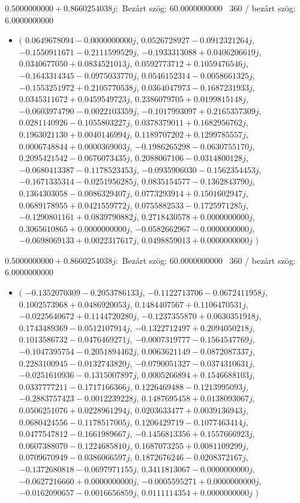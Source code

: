 \documentclass[14pt,a4paper]{article}
\begin{document}
$0.5000000000+0.8660254038j$:\
Bezárt szög: $60.0000000000$ \
360 / bezárt szög: $6.0000000000$\
\begin{itemize}
\item
$\big($
$0.0649678094-0.0000000000j$, $0.0526728927-0.0912321264j$, $-0.1550911671-0.2111599529j$, $-0.1933313088+0.0406206619j$, $0.0340677050+0.0834521013j$, $0.0592773712+0.1059476546j$, $-0.1643314345-0.0975033770j$, $0.0546152314-0.0058661325j$, $-0.1553251972+0.2105770538j$, $0.0364047973-0.1687231933j$, $0.0345311672+0.0459549723j$, $0.2386079705+0.0199815148j$, $-0.0603974790-0.0022103359j$, $-0.1017993097+0.2165357309j$, $0.0281140926-0.1055803227j$, $0.0378379011+0.1682956762j$, $0.1963021130+0.0040146994j$, $0.1189707202+0.1299785557j$, $0.0006748844+0.0000369003j$, $-0.1986265298-0.0630755170j$, $0.2095421542-0.0676073435j$, $0.2088067106-0.0314800128j$, $-0.0680413387-0.1178523453j$, $-0.0935906030-0.1562354453j$, $-0.1671335314-0.0251956285j$, $0.0835154577-0.1362843790j$, $0.1364303058-0.0086329407j$, $0.0773293914+0.1501602947j$, $0.0689178955+0.0421559772j$, $0.0755882533-0.1725971285j$, $-0.1290801161+0.0839790882j$, $0.2718430578+0.0000000000j$, $0.3065610865+0.0000000000j$, $-0.0582662967-0.0000000000j$, $-0.0698069133+0.0022317617j$, $0.0498859013+0.0000000000j$
$\big)$
\end{itemize}
$0.5000000000+0.8660254038j$:\
Bezárt szög: $60.0000000000$ \
360 / bezárt szög: $6.0000000000$\
\begin{itemize}
\item
$\big($
$-0.1352070309-0.2053786133j$, $-0.1122713706-0.0672411958j$, $0.1002573968+0.0486920053j$, $0.1484407567+0.1106470531j$, $-0.0225640672+0.1144720280j$, $-0.1237355870+0.0630351918j$, $0.1743489369-0.0512107914j$, $-0.1322712497+0.2094050218j$, $0.1013586732-0.0476469271j$, $-0.0007319777-0.1564547769j$, $-0.1047395754-0.2051894462j$, $0.0063621149-0.0872087337j$, $0.2283100945-0.0132743820j$, $-0.0790051327-0.0374310631j$, $-0.0251610936-0.1315007897j$, $0.0005266894+0.1546688103j$, $0.0337777211-0.1717166366j$, $0.1226469488-0.1213995093j$, $-0.2883757423-0.0012239228j$, $0.1487695458+0.0138093067j$, $0.0506251076+0.0228961294j$, $0.0203633477+0.0039136943j$, $0.0680424556-0.1178517005j$, $0.1206429719-0.1077463414j$, $0.0477547812-0.1661989667j$, $-0.1456813356+0.1557666923j$, $0.0607388070-0.1224685810j$, $0.1687073255+0.0081109299j$, $0.0709670949-0.0386066597j$, $0.1872676246-0.0208372167j$, $-0.1372680818-0.0697971155j$, $0.3411813067-0.0000000000j$, $-0.0627216660+0.0000000000j$, $-0.0005595271+0.0000000000j$, $-0.0162090657-0.0016656859j$, $0.0111114354+0.0000000000j$
$\big)$
\end{itemize}
\end{document}
